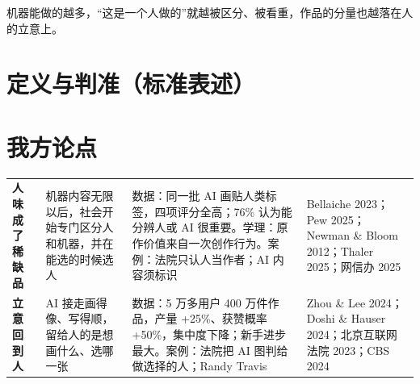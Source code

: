 \documentclass[quick,pro]{debate}
\begin{document}
\debatetitle
\begin{thesisbox}机器能做的越多，“这是一个人做的”就越被区分、被看重，作品的分量也越落在人的立意上。\end{thesisbox}

\section{定义与判准（标准表述）}
\begin{fields}
\end{fields}

\section{我方论点}
\begin{tabularx}{\linewidth}{@{}L{5em}Y Y L{6.4em}@{}}\toprule
{}&&&\\\midrule
\textbf{人味成了稀缺品}&机器内容无限以后，社会开始专门区分人和机器，并在能选的时候选人&数据：同一批 AI 画贴人类标签，四项评分全高；76\% 认为能分辨人或 AI 很重要。学理：原作价值来自一次创作行为。案例：法院只认人当作者；AI 内容须标识&Bellaiche 2023；Pew 2025；Newman \& Bloom 2012；Thaler 2025；网信办 2025\\
\textbf{立意回到人}&AI 接走画得像、写得顺，留给人的是想画什么、选哪一张&数据：5 万多用户 400 万件作品，产量 +25\%、获赞概率 +50\%，集中度下降；新手进步最大。案例：法院把 AI 图判给做选择的人；Randy Travis&Zhou \& Lee 2024；Doshi \& Hauser 2024；北京互联网法院 2023；CBS 2024\\
\bottomrule\end{tabularx}
\end{document}
